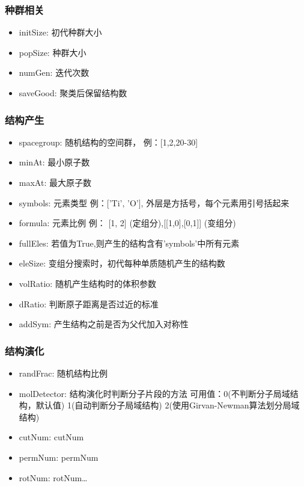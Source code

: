 \documentclass[12pt]{article}
\begin{document}
\subsubsection{种群相关}
\begin{itemize}
    \item initSize: 初代种群大小
    \item popSize: 种群大小
    \item numGen: 迭代次数
    \item saveGood: 聚类后保留结构数
\end{itemize}

\subsubsection{结构产生}
\begin{itemize}
    \item spacegroup: 随机结构的空间群，
    例：[1,2,20-30]
    \item minAt: 最小原子数
    \item maxAt: 最大原子数
    \item symbols: 元素类型
    例：['Ti', 'O'], 外层是方括号，每个元素用引号括起来
    \item formula: 元素比例
    例： [1, 2] (定组分),[[1,0],[0,1]] (变组分)
    \item fullEles: 若值为True,则产生的结构含有'symbols'中所有元素
    \item eleSize: 变组分搜索时，初代每种单质随机产生的结构数
    \item volRatio: 随机产生结构时的体积参数
    \item dRatio: 判断原子距离是否过近的标准
    \item addSym: 产生结构之前是否为父代加入对称性
\end{itemize}

\subsubsection{结构演化}
\begin{itemize}
    \item randFrac: 随机结构比例
    \item molDetector: 结构演化时判断分子片段的方法
    可用值：0(不判断分子局域结构，默认值)  1(自动判断分子局域结构)  2(使用Girvan-Newman算法划分局域结构)
    \item cutNum: cutNum
    \item permNum: permNum
    \item rotNum: rotNum\dots
\end{itemize} 
\end{document}
